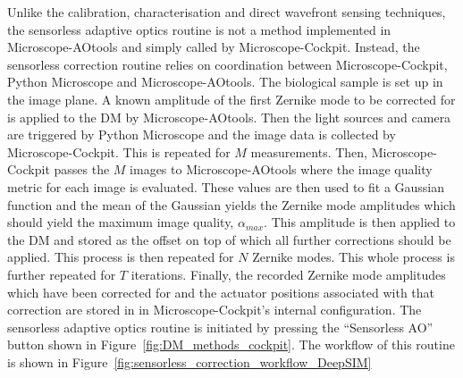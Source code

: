 Unlike the calibration, characterisation and direct wavefront sensing techniques, the sensorless adaptive optics routine is not a method implemented in Microscope-AOtools and simply called by Microscope-Cockpit. Instead, the sensorless correction routine relies on coordination between Microscope-Cockpit, Python Microscope and Microscope-AOtools. The biological sample is set up in the image plane. A known amplitude of the first Zernike mode to be corrected for is applied to the DM by Microscope-AOtools. Then the light sources and camera are triggered by Python Microscope and the image data is collected by Microscope-Cockpit. This is repeated for $M$ measurements. Then, Microscope-Cockpit passes the $M$ images to Microscope-AOtools where the image quality metric for each image is evaluated. These values are then used to fit a Gaussian function and the mean of the Gaussian yields the Zernike mode amplitudes which should yield the maximum image quality, $\alpha_{max}$. This amplitude is then applied to the DM and stored as the offset on top of which all further corrections should be applied. This process is then repeated for $N$ Zernike modes. This whole process is further repeated for $T$ iterations. Finally, the recorded Zernike mode amplitudes which have been corrected for and the actuator positions associated with that correction are stored in in Microscope-Cockpit's internal configuration. The sensorless adaptive optics routine is initiated by pressing the ``Sensorless AO'' button shown in Figure~\ref{fig:DM_methods_cockpit}. The workflow of this routine is shown in Figure~\ref{fig:sensorless_correction_workflow_DeepSIM}

